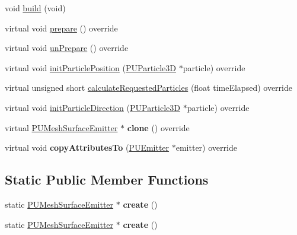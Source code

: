 \begin{DoxyCompactItemize}
\item 
void \hyperlink{classPUMeshSurfaceEmitter_a7447a884e8a62d8d20f4e336f4c6df6e}{build} (void)
\item 
virtual void \hyperlink{classPUMeshSurfaceEmitter_aefa9d3f5f053d6d3ec5c79e5602c0db3}{prepare} () override
\item 
virtual void \hyperlink{classPUMeshSurfaceEmitter_abb5dc9cdae782120a56781c51b393b6a}{un\+Prepare} () override
\item 
virtual void \hyperlink{classPUMeshSurfaceEmitter_a868c19220258dc73548b344edd8f3e18}{init\+Particle\+Position} (\hyperlink{structPUParticle3D}{P\+U\+Particle3D} $\ast$particle) override
\item 
virtual unsigned short \hyperlink{classPUMeshSurfaceEmitter_a11bb2e8f1f8611bfbacec1e9cd3789e9}{calculate\+Requested\+Particles} (float time\+Elapsed) override
\item 
virtual void \hyperlink{classPUMeshSurfaceEmitter_a57b3e6788ced8af0dc152f0198fd7f97}{init\+Particle\+Direction} (\hyperlink{structPUParticle3D}{P\+U\+Particle3D} $\ast$particle) override
\item 
\mbox{\label{classPUMeshSurfaceEmitter_a79817aad1995fae45544e1f661a0be9a}} 
virtual \hyperlink{classPUMeshSurfaceEmitter}{P\+U\+Mesh\+Surface\+Emitter} $\ast$ {\bfseries clone} () override
\item 
\mbox{\label{classPUMeshSurfaceEmitter_afc2feefeba6b14ad3f5ac716349b8fb7}} 
virtual void {\bfseries copy\+Attributes\+To} (\hyperlink{classPUEmitter}{P\+U\+Emitter} $\ast$emitter) override
\end{DoxyCompactItemize}
\subsection*{Static Public Member Functions}
\begin{DoxyCompactItemize}
\item 
\mbox{\label{classPUMeshSurfaceEmitter_ae603f262a5d65b6f3cdd5cf18832b610}} 
static \hyperlink{classPUMeshSurfaceEmitter}{P\+U\+Mesh\+Surface\+Emitter} $\ast$ {\bfseries create} ()
\item 
\mbox{\label{classPUMeshSurfaceEmitter_a6b7794b0d1f46c8dee5af9da8e9eb6bb}} 
static \hyperlink{classPUMeshSurfaceEmitter}{P\+U\+Mesh\+Surface\+Emitter} $\ast$ {\bfseries create} ()
\end{DoxyCompactItemize}
